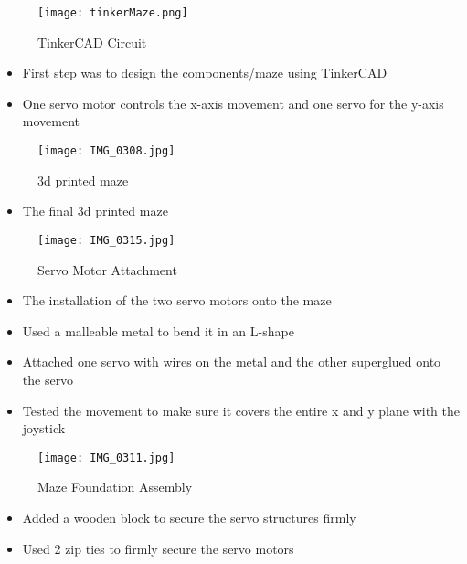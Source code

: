 \documentclass[12pt]{article}
\begin{document}
\vspace*{0.5cm} %
\begin{figure}[H]
    \centering
    \texttt{[image: tinkerMaze.png]}
    \caption{TinkerCAD Circuit}
    \label{fig:enter-label}
\end{figure}



\begin{itemize}
    \item First step was to design the components/maze using TinkerCAD
    \item One servo motor controls the x-axis movement and one servo for the y-axis movement
  \end{itemize}

  \begin{figure}[H]
    \centering
    \texttt{[image: IMG\_0308.jpg]}
    \caption{3d printed maze}
    \label{fig:enter-label}
\end{figure}

\begin{itemize}
  \item The final 3d printed maze
\end{itemize}

\begin{figure}[H]
    \centering
    \texttt{[image: IMG\_0315.jpg]}
    \caption{Servo Motor Attachment}
    \label{fig:enter-label}
\end{figure}

\begin{itemize}
    \item The installation of the two servo motors onto the maze
    \item Used a malleable metal to bend it in an L-shape
    \item Attached one servo with wires on the metal and the other superglued onto the servo
    \item Tested the movement to make sure it covers the entire x and y plane with the joystick
  \end{itemize}

\begin{figure}[H]
    \centering
    \texttt{[image: IMG\_0311.jpg]}
    \caption{Maze Foundation Assembly}
    \label{fig:enter-label}
\end{figure}

\begin{itemize}
    \item Added a wooden block to secure the servo structures firmly
    \item Used 2 zip ties to firmly secure the servo motors
  \end{itemize}
\end{document}
